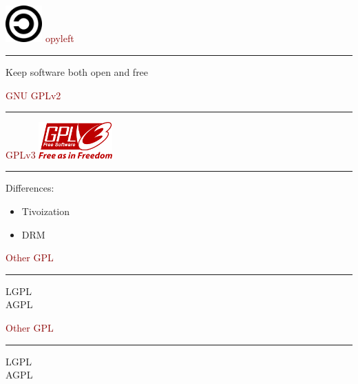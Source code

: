 \documentclass[c]{beamer}
\begin{document}
  \begin{frame}
    \includegraphics[width=40pt]{copyleft}
    \textcolor{darkred}{{\fontsize{50pt}{1em}\selectfont opyleft \\}}
    \vspace{1em} \hrule \vspace{1em}
    {\fontsize{20pt}{1em}\selectfont Keep software both open and free}
  \end{frame}
  \begin{frame}
    \textcolor{darkred}{{\fontsize{50pt}{1em}\selectfont GNU GPLv2 \\}}
    \vspace{1em} \hrule \vspace{1em}
  \end{frame}
  \begin{frame}
    \textcolor{darkred}{{\fontsize{50pt}{1em}\selectfont GPLv3}}
    \hfill \includegraphics[width=80pt]{gplv3} \\
    \vspace{1em} \hrule \vspace{1em}
     Differences:
     \begin{itemize}
       \item Tivoization
       \item DRM
     \end{itemize}
  \end{frame}
  \begin{frame}
    \textcolor{darkred}{{\fontsize{50pt}{1em}\selectfont Other GPL  \\}}
    \vspace{1em} \hrule \vspace{1em}
    {\fontsize{20pt}{1em}\selectfont LGPL} \\ \vspace{1em}
    {\fontsize{20pt}{1em}\selectfont AGPL}
  \end{frame}


  \begin{frame}
    \textcolor{darkred}{{\fontsize{50pt}{1em}\selectfont Other GPL  \\}}
    \vspace{1em} \hrule \vspace{1em}
    {\fontsize{20pt}{1em}\selectfont LGPL} \\ \vspace{1em}
    {\fontsize{20pt}{1em}\selectfont AGPL}
  \end{frame}



\end{document}
